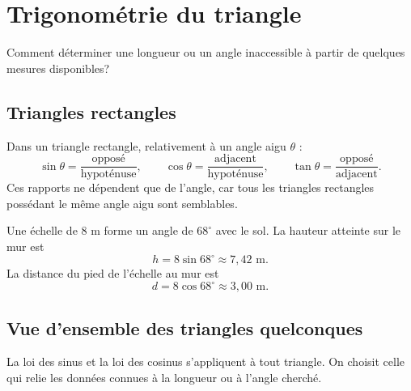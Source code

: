 \chapter{Trigonométrie du triangle}
\label{manual:chapter:15}

\begin{questionbox}
Comment déterminer une longueur ou un angle inaccessible à partir de quelques mesures disponibles?
\end{questionbox}

\section{Triangles rectangles}
\label{manual:section:15.01}

Dans un triangle rectangle, relativement à un angle aigu $\theta$ :
\[
\sin\theta=\frac{\text{opposé}}{\text{hypoténuse}},
\qquad
\cos\theta=\frac{\text{adjacent}}{\text{hypoténuse}},
\qquad
\tan\theta=\frac{\text{opposé}}{\text{adjacent}}.
\]
Ces rapports ne dépendent que de l'angle, car tous les triangles rectangles possédant le même angle aigu sont semblables.

\begin{center}
\end{center}

\begin{examplebox}
Une échelle de $8$ m forme un angle de $68^\circ$ avec le sol. La hauteur atteinte sur le mur est
\[
h=8\sin68^\circ\approx7{,}42\text{ m}.
\]
La distance du pied de l'échelle au mur est
\[
d=8\cos68^\circ\approx3{,}00\text{ m}.
\]
\end{examplebox}

\section{Vue d'ensemble des triangles quelconques}
\label{manual:section:15.02}

La loi des sinus et la loi des cosinus s'appliquent à tout triangle. On choisit celle qui relie les données connues à la longueur ou à l'angle cherché.

